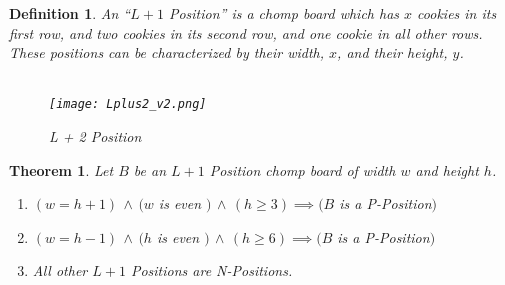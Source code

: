 \documentclass{amsart}
\newtheorem{thm}{Theorem}
\newtheorem{term}{Definition} %
\theoremstyle{definition}
\theoremstyle{remark}
\numberwithin{equation}{section}
\begin{document}
\begin{term}
An ``$L+1$ Position'' is a chomp board which has $x$ cookies in its first row, and two cookies in its second row, and one cookie in all other rows. These positions can be characterized by their width, $x$, and their height, $y$.\\ 
\\
\begin{figure}[Lplus2]
\texttt{[image: Lplus2\_v2.png]}
\caption{L + 2 Position}
\end{figure}
\end{term}


\begin{thm}
	Let $B$ be an $L+1$ Position chomp board of width $w$ and height $h$.
	\begin{enumerate}
		\item $(w = h + 1) \,\land\, (w$ is even $)\,\land\,( h \geq 3) \implies (B$ is a P-Position$)$
		\item $(w = h - 1) \,\land\, (h$ is even $)\,\land\,( h \geq 6) \implies (B$ is a P-Position$)$
		\item All other $L+1$ Positions are N-Positions.
	\end{enumerate}
\end{thm}
\clearpage
\end{document}
